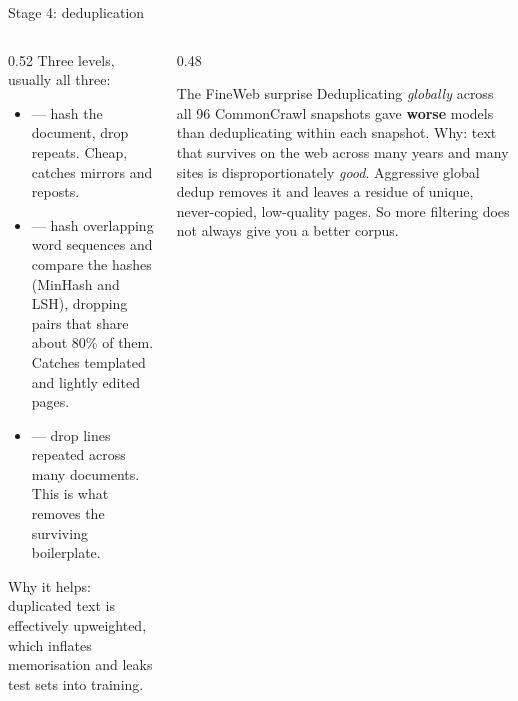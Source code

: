 \documentclass[aspectratio=169,10pt]{beamer}
\begin{document}
\begin{frame}[shrink=7]{Stage 4: deduplication}
  \begin{columns}[T]
    \begin{column}{0.52\textwidth}
      Three levels, usually all three:
      \begin{itemize}
        \item {} --- hash the document, drop repeats. Cheap, catches
          mirrors and reposts.
        \item {} --- hash overlapping word sequences and
          compare the hashes (MinHash and LSH), dropping pairs that share about
          80\% of them. Catches templated and lightly edited pages.
        \item {} --- drop lines repeated across many documents.
          This is what removes the surviving boilerplate.
      \end{itemize}
      \vspace{0.4em}
      Why it helps: duplicated text is effectively upweighted, which inflates
      memorisation and leaks test sets into training.
    \end{column}
    \begin{column}{0.48\textwidth}
      \begin{block}{The FineWeb surprise}
        \small
        Deduplicating \emph{globally} across all 96 CommonCrawl snapshots gave
        \textbf{worse} models than deduplicating within each snapshot.
        \vspace{0.4em}
        Why: text that survives on the web across many years and many sites is
        disproportionately \emph{good}. Aggressive global dedup removes it and
        leaves a residue of unique, never-copied, low-quality pages.
        \vspace{0.4em}
        So more filtering does not always give you a better corpus.
      \end{block}
    \end{column}
  \end{columns}
\end{frame}
\end{document}
